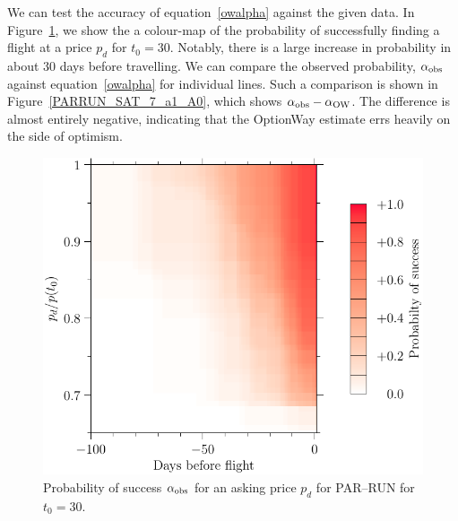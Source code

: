 \documentclass{article}
\begin{document}
We can test the accuracy of equation~\eqref{owalpha} against the given
data.  In Figure~\ref{PARRUN_SAT_7_a0}, we show the a colour-map of the
probability of successfully finding a flight at a price $p_d$ for
$t_0=30$.  Notably, there is a large increase in probability in about
30 days before travelling.  We can compare the observed probability,
$\alpha_{\rm{obs}}$ against equation~\eqref{owalpha} for individual
lines.  Such a comparison is shown in Figure~\ref{PARRUN_SAT_7_a1_A0},
which shows $\alpha_{\rm{obs}}-\alpha_{\rm{OW}}$.  The difference is
almost entirely negative, indicating that the OptionWay estimate errs
heavily on the side of optimism.  
\begin{figure}
  \begin{center}
    \includegraphics{pdf/PARRUN_SAT_7_a0}
    \caption{Probability of success $\alpha_{\rm{obs}}$ for an asking
      price $p_d$ for PAR--RUN for $t_0=30$.}
    \label{PARRUN_SAT_7_a0}
  \end{center}
\end{figure}
\end{document}
